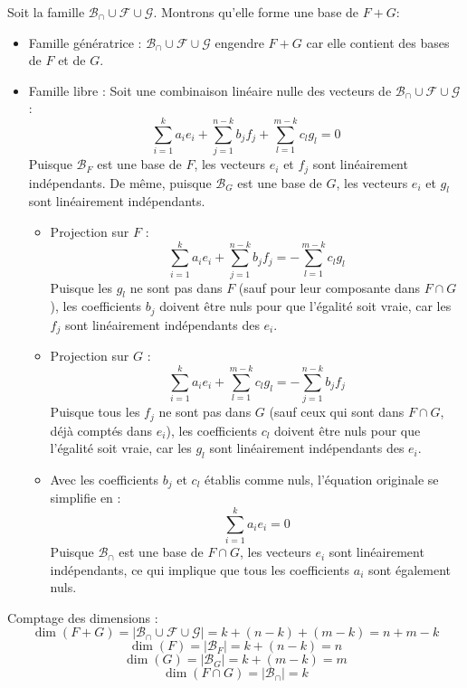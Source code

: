 \documentclass[10pt,a4paper]{article}
\begin{document}
Soit la famille $\mathcal{B}_\cap \cup \mathcal{F} \cup \mathcal{G}$. Montrons qu'elle forme une
base de $F + G$:
\begin{itemize}
    \item Famille génératrice : $\mathcal{B}_\cap \cup \mathcal{F} \cup \mathcal{G}$ engendre $F +
    G$ car elle contient des bases de $F$ et de $G$.
    \item Famille libre : Soit une combinaison linéaire nulle des vecteurs de $\mathcal{B}_\cap \cup
    \mathcal{F} \cup \mathcal{G}$ :
    $$
    \sum_{i=1}^{k} a_i e_i + \sum_{j=1}^{n-k} b_j f_j + \sum_{l=1}^{m-k} c_l g_l = 0
    $$
    Puisque $\mathcal{B}_F$ est une base de $F$, les vecteurs $e_i$ et $f_j$ sont linéairement
    indépendants. De même, puisque $\mathcal{B}_G$ est une base de $G$, les vecteurs $e_i$ et $g_l$
    sont linéairement indépendants.

    \begin{itemize}
        \item Projection sur $F$ :
        $$
        \sum_{i=1}^{k} a_i e_i + \sum_{j=1}^{n-k} b_j f_j = -\sum_{l=1}^{m-k} c_l g_l
        $$
        Puisque les $g_l$ ne sont pas dans $F$ (sauf pour leur composante dans $F \cap G$), les
        coefficients $b_j$ doivent être nuls pour que l'égalité soit vraie, car les $f_j$ sont
        linéairement indépendants des $e_i$.
        \item Projection sur $G$ :
        $$
        \sum_{i=1}^{k} a_i e_i + \sum_{l=1}^{m-k} c_l g_l = -\sum_{j=1}^{n-k} b_j f_j
        $$
        Puisque tous les $f_j$ ne sont pas dans $G$ (sauf ceux qui sont dans $F \cap G$, déjà
        comptés dans $e_i$), les coefficients $c_l$ doivent être nuls pour que l'égalité soit vraie,
        car les $g_l$ sont linéairement indépendants des $e_i$.
        \item Avec les coefficients $b_j$ et $c_l$ établis comme nuls, l'équation originale se
        simplifie en :
        $$
        \sum_{i=1}^{k} a_i e_i = 0
        $$
        Puisque $\mathcal{B}_\cap$ est une base de $F \cap G$, les vecteurs $e_i$ sont linéairement
        indépendants, ce qui implique que tous les coefficients $a_i$ sont également nuls.
    \end{itemize}


\end{itemize}

Comptage des dimensions :
\[ \dim(F + G) = |\mathcal{B}_\cap \cup \mathcal{F} \cup \mathcal{G}| = k + (n-k) + (m-k) = n + m - k \]
\[ \dim(F) = |\mathcal{B}_F| = k + (n-k) = n \]
\[ \dim(G) = |\mathcal{B}_G| = k + (m-k) = m \]
\[ \dim(F \cap G) = |\mathcal{B}_\cap| = k \]
\end{document}
